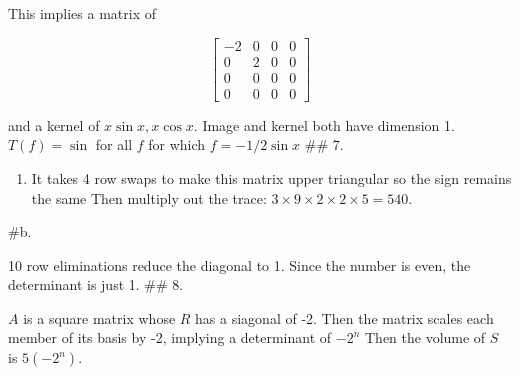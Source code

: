 \documentclass[
]{article}
\providecommand{\tightlist}{%
  \setlength{\itemsep}{0pt}\setlength{\parskip}{0pt}}
\begin{document}
This implies a matrix of

\[
  \begin{bmatrix}
  -2 & 0 & 0 & 0\\
  0 & 2 & 0 & 0\\
  0& 0 & 0 & 0\\
  0 & 0 & 0 & 0
  \end{bmatrix}
\]

and a kernel of \(x\sin x, x\cos x\). Image and kernel both have
dimension 1. \(T(f) = \sin\) for all \(f\) for which \(f = -1/2\sin x\)
\#\# 7.

\begin{enumerate}
\def\labelenumi{\alph{enumi}.}
\tightlist
\item
  It takes 4 row swaps to make this matrix upper triangular so the sign
  remains the same Then multiply out the trace:
  \(3 \times 9 \times 2 \times 2 \times 5 = 540\).
\end{enumerate}

\#b.

10 row eliminations reduce the diagonal to 1. Since the number is even,
the determinant is just 1. \#\# 8.

\(A\) is a square matrix whose \(R\) has a siagonal of -2. Then the
matrix scales each member of its basis by -2, implying a determinant of
\(-2^n\) Then the volume of \(S\) is \(5(-2^n)\).
\end{document}
